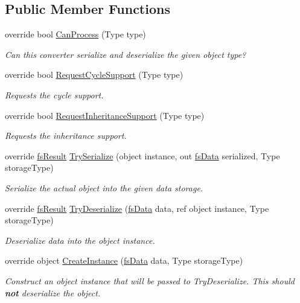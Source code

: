 \subsection*{Public Member Functions}
\begin{DoxyCompactItemize}
\item 
override bool \hyperlink{class_full_serializer_1_1_internal_1_1fs_type_converter_afbf95621a91efff18569544dee5134fe}{Can\+Process} (Type type)
\begin{DoxyCompactList}\small\item\em Can this converter serialize and deserialize the given object type? \end{DoxyCompactList}\item 
override bool \hyperlink{class_full_serializer_1_1_internal_1_1fs_type_converter_a60f6421c5356bcf6954d3c888bbaf860}{Request\+Cycle\+Support} (Type type)
\begin{DoxyCompactList}\small\item\em Requests the cycle support. \end{DoxyCompactList}\item 
override bool \hyperlink{class_full_serializer_1_1_internal_1_1fs_type_converter_a3f4750a4e8a6a6ae582c73cf5d8142e5}{Request\+Inheritance\+Support} (Type type)
\begin{DoxyCompactList}\small\item\em Requests the inheritance support. \end{DoxyCompactList}\item 
override \hyperlink{struct_full_serializer_1_1fs_result}{fs\+Result} \hyperlink{class_full_serializer_1_1_internal_1_1fs_type_converter_aced300086882c6f0ce70ff8ff7ae46c2}{Try\+Serialize} (object instance, out \hyperlink{class_full_serializer_1_1fs_data}{fs\+Data} serialized, Type storage\+Type)
\begin{DoxyCompactList}\small\item\em Serialize the actual object into the given data storage. \end{DoxyCompactList}\item 
override \hyperlink{struct_full_serializer_1_1fs_result}{fs\+Result} \hyperlink{class_full_serializer_1_1_internal_1_1fs_type_converter_aa94af57c0f67c755cb406529813a13aa}{Try\+Deserialize} (\hyperlink{class_full_serializer_1_1fs_data}{fs\+Data} data, ref object instance, Type storage\+Type)
\begin{DoxyCompactList}\small\item\em Deserialize data into the object instance. \end{DoxyCompactList}\item 
override object \hyperlink{class_full_serializer_1_1_internal_1_1fs_type_converter_af2049f4529f9138347b63bee54aa7397}{Create\+Instance} (\hyperlink{class_full_serializer_1_1fs_data}{fs\+Data} data, Type storage\+Type)
\begin{DoxyCompactList}\small\item\em Construct an object instance that will be passed to Try\+Deserialize. This should {\bfseries not} deserialize the object. \end{DoxyCompactList}\end{DoxyCompactItemize}
